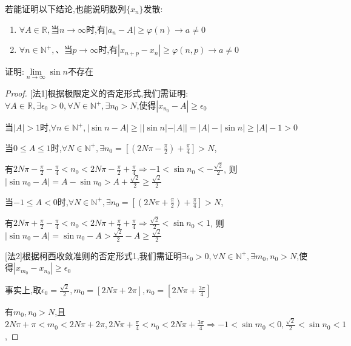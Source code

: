 \begin{note}若能证明以下结论,也能说明数列$\{x_n\}$发散:
    \begin{enumerate}
        \item $\forall A\in \mathbb{R},\mbox{当} n\to \infty \mbox{时,有}|a_n-A| \ge \varphi (n) \to a \ne 0$
        \item $\forall n\in \mathbb{N}^+,、\mbox{当}p\to \infty \mbox{时,有} |x_{n+p}-x_n| \ge \varphi(n,p) \to a \ne 0$
    \end{enumerate}
\end{note}

\begin{example}
    证明:$\lim \limits_{n \to \infty} \sin n$不存在
\end{example}

\begin{proof}
    
    [法1]根据极限定义的否定形式,我们需证明:$ \forall A \in \mathbb{R}, \exists \epsilon_0 > 0,\forall N\in \mathbb{N}^+,\exists n_0 > N$,使得$|x_{n_0}-A|\ge \epsilon_0$

    当$|A|>1$时,$\forall n\in \mathbb{N}^+,|\sin n - A| \ge ||\sin n|-|A||=|A|-|\sin n|\ge |A|-1>0$

    当$0\le A \le 1$时,$\forall N\in \mathbb{N}^+,\exists n_0=[(2N\pi - \frac{\pi}{2})+\frac{\pi}{4}]>N$,
    
    有$2N\pi - \frac{\pi}{2}-\frac{\pi}{4} < n_0 < 2N\pi -\frac{\pi}{2}+\frac{\pi}{4} \Longrightarrow -1 < \sin n_0 < -\frac{\sqrt{2}}{2}$,
    则$|\sin n_0 -A|=A-\sin n_0 > A+\frac{\sqrt{2}}{2}\ge \frac{\sqrt{2}}{2}$

    当$-1\le A<0$时,$\forall N\in \mathbb{N}^+,\exists n_0=[(2N\pi + \frac{\pi}{2})+\frac{\pi}{4}]>N$,
    
    有$2N\pi + \frac{\pi}{2}-\frac{\pi}{4} < n_0 < 2N\pi +\frac{\pi}{2}+\frac{\pi}{4} \Longrightarrow \frac{\sqrt{2}}{2} < \sin n_0 < 1 $,
    则$|\sin n_0 -A|=\sin n_0 - A > \frac{\sqrt{2}}{2} - A \ge \frac{\sqrt{2}}{2}$

    [法2]根据柯西收敛准则的否定形式1,我们需证明$\exists \epsilon_0 > 0,\forall N\in \mathbb{N}^+,\exists m_0,n_0 > N$,使得$|x_{m_0}-x_{n_0}|\ge \epsilon_0 $

    事实上,取$\epsilon_0=\frac{\sqrt{2}}{2},m_0=[2N\pi + 2\pi] ,n_0=[2N\pi + \frac{3\pi}{4}]$

    有$m_0,n_0>N$,且$2N\pi + \pi <m_0< 2N\pi + 2\pi,2N\pi +\frac{\pi}{4}<n_0<2N\pi + \frac{3\pi}{4}\Longrightarrow -1<\sin m_0<0,\frac{\sqrt{2}}{2}<\sin n_0<1$,
    

\end{proof}
